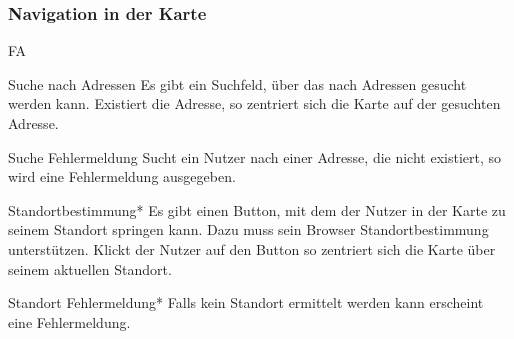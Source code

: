 \subsubsection*{Navigation in der Karte}
\begin{Kriterien}{FA}
  \item[Suche nach Adressen]
    Es gibt ein Suchfeld, über das nach Adressen gesucht werden kann. Existiert die Adresse, so zentriert sich die Karte 
    auf der gesuchten Adresse.

  \item[Suche Fehlermeldung]
    Sucht ein Nutzer nach einer Adresse, die nicht existiert, so wird eine Fehlermeldung ausgegeben. 

  \item[Standortbestimmung*]
    Es gibt einen Button, mit dem der Nutzer in der Karte zu seinem Standort springen kann. Dazu 
    muss sein Browser Standortbestimmung unterstützen. Klickt der Nutzer auf den Button so zentriert sich die Karte über seinem 
    aktuellen Standort.
  
  \item[Standort Fehlermeldung*]
    Falls kein Standort ermittelt werden kann erscheint eine Fehlermeldung.
\end{Kriterien}

